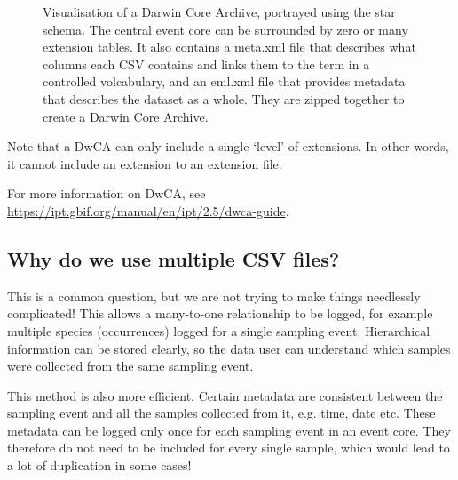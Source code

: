 \documentclass[a4paper,english, 11pt]{article}
\begin{document}
\begin{figure}[htb]
    \caption{\label{fig:dwca}
        Visualisation of a Darwin Core Archive, portrayed using the star schema. The
        central event core can be surrounded by zero or many extension tables.
        It also contains a meta.xml file that describes what columns each CSV contains and links them to the term in a controlled volcabulary, and an eml.xml file that provides metadata that describes the dataset as a whole. They are zipped together to create a Darwin Core Archive.
    }
\end{figure}

Note that a DwCA can only include a single `level' of extensions. In other words, it cannot include an extension to an extension file.

For more information on DwCA, see \url{https://ipt.gbif.org/manual/en/ipt/2.5/dwca-guide}.

\subsection{Why do we use multiple CSV files?}
\label{ss:multiplefiles}

This is a common question, but we are not trying to make things needlessly complicated! This allows a many-to-one relationship to be logged, for example multiple species (occurrences) logged for a single sampling event. Hierarchical information can be stored clearly, so the data user can understand which samples were collected from the same sampling event.

This method is also more efficient. Certain metadata are consistent between the sampling event and all the samples collected from it, e.g. time, date etc. These metadata can be logged only once for each sampling event in an event core. They therefore do not need to be included for every single sample, which would lead to a lot of duplication in some cases!
\end{document}
